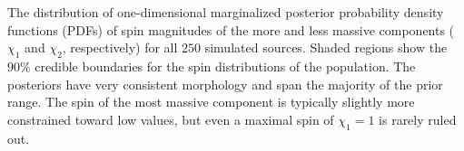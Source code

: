 \label{fig:spinPDFcred} The distribution of one-dimensional marginalized posterior probability density functions (PDFs) of spin magnitudes of the more and less massive components ($\chi_1$ and $\chi_2$, respectively) for all $250$ simulated sources. Shaded regions show the $90\%$ credible boundaries for the spin distributions of the population.  The posteriors have very consistent morphology and span the majority of the prior range.  The spin of the most massive component is typically slightly more constrained toward low values, but even a maximal spin of $\chi_1 = 1$ is rarely ruled out.
